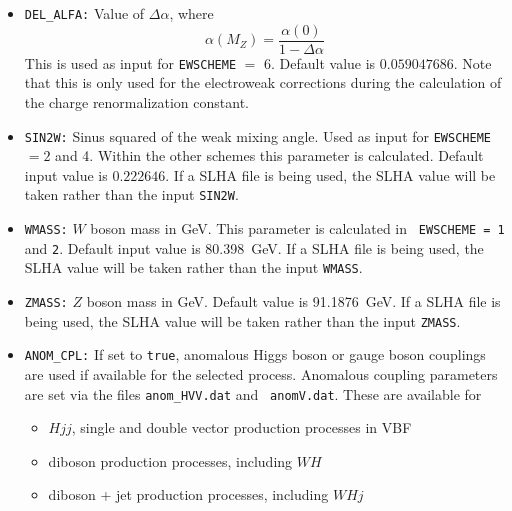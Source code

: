 \documentclass[english,12pt]{article}
\begin{document}
\begin{itemize}
{\tt EWSCHEME} $=$ 1, 4, 5 and 6.  Within the other schemes this parameter is
calculated. The default value depends on the choice of {\tt EWSCHEME}, as given
in Table~\ref{tab:Schemes}.  If {\tt EWSCHEME = 5} is chosen, the value of
$\alpha$ should be $\alpha(M_{Z})$, whereas if {\tt EWSCHEME = 6} is chosen, the
value of $\alpha$ should be $\alpha(0)$.  In order to ensure backwards
compatibility with previous versions of \textsc{Vbfnlo}, as an alternative {\tt
ALFA}, the fine structure constant, can be used as an input in {\tt vbfnlo.dat},
which is read and used only if {\tt INVALFA} is not present. If a SLHA file is
being used, the SLHA value will be taken rather than the input {\tt INVALFA} or
{\tt ALFA}. 
\item {\tt DEL\_ALFA:} Value of $\Delta \alpha$, where
\begin{equation}
 \alpha(M_{Z}) = \frac{\alpha(0)}{1 - \Delta \alpha}
\end{equation}
This is used as input for {\tt EWSCHEME} $=$ 6.  Default value is $0.059047686$.
 Note that this is only used for the electroweak corrections during the
calculation of the charge renormalization constant.
\item {\tt SIN2W:} Sinus squared of the weak mixing angle. Used as input for
  {\tt EWSCHEME} $= 2$ and 4. Within the other schemes this parameter is
  calculated. Default input value is $0.222646$.  If a SLHA file is being used, the SLHA value will be taken rather than the input {\tt SIN2W}.
\item {\tt WMASS:} $W$ boson mass in GeV. This parameter is calculated in {\tt
EWSCHEME = 1} and {\tt 2}.  Default input value is 80.398~GeV.  If a SLHA file is being used, the SLHA value will be taken rather than the input {\tt WMASS}.
\item {\tt ZMASS:} $Z$ boson mass in GeV. Default value is 91.1876~GeV.  If a SLHA file is being used, the SLHA value will be taken rather than the input {\tt ZMASS}.
\item {\tt ANOM\_CPL:} If set to {\tt true}, anomalous Higgs boson or gauge
boson couplings are used if available for the selected process. Anomalous
coupling parameters are set via the files {\tt anom\_HVV.dat} and {\tt
anomV.dat}.  These are available for   
  \begin{itemize}
    \item $Hjj$, single and double vector production processes in VBF 
    \item diboson production processes, including $WH$
    \item diboson + jet production processes, including $WHj$

\end{itemize}
\end{itemize}
\end{document}

